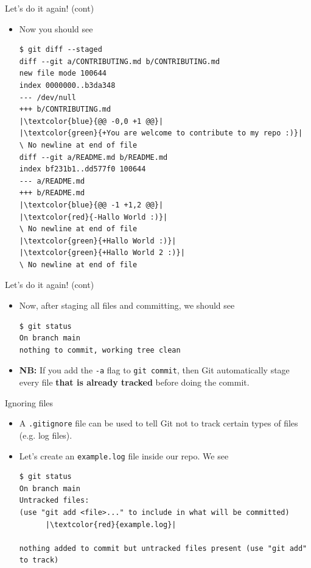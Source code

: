 \documentclass[
hyperref={bookmarks=false},
xcolor={dvipsnames,svgnames*,x11names*}, 
12pt
]{beamer}
\begin{document}
\begin{frame}[fragile]{Let's do it again! (cont)}
\vspace{-0.5cm}
\begin{itemize}
\itemsep 2ex
\item Now you should see
\begin{lstlisting}
$ git diff --staged
diff --git a/CONTRIBUTING.md b/CONTRIBUTING.md
new file mode 100644
index 0000000..b3da348
--- /dev/null
+++ b/CONTRIBUTING.md
|\textcolor{blue}{@@ -0,0 +1 @@}|
|\textcolor{green}{+You are welcome to contribute to my repo :)}|
\ No newline at end of file
diff --git a/README.md b/README.md
index bf231b1..dd577f0 100644
--- a/README.md
+++ b/README.md
|\textcolor{blue}{@@ -1 +1,2 @@}|
|\textcolor{red}{-Hallo World :)}|
\ No newline at end of file
|\textcolor{green}{+Hallo World :)}|
|\textcolor{green}{+Hallo World 2 :)}|
\ No newline at end of file
\end{lstlisting}
\end{itemize}
\end{frame}

\begin{frame}[fragile]{Let's do it again! (cont)}
\vspace{-0.5cm}
\begin{itemize}
\itemsep 2ex
\item Now, after staging all files and committing, we should see 
\begin{lstlisting}
$ git status
On branch main
nothing to commit, working tree clean
\end{lstlisting}
\item \textbf{NB:} If you add the \texttt{-a} flag to \texttt{git commit}, then Git automatically stage every file \textbf{that is already tracked} before doing the commit. 
\end{itemize}
\end{frame}

\begin{frame}[fragile]{Ignoring files}
\vspace{-0.5cm}
\begin{itemize}
\itemsep 2ex
\item A \texttt{.gitignore} file can be used to tell Git not to track certain types of files (e.g. log files). 
\item Let's create an \texttt{example.log} file inside our repo. We see 
\begin{lstlisting}
$ git status
On branch main
Untracked files:
(use "git add <file>..." to include in what will be committed)
      |\textcolor{red}{example.log}|

nothing added to commit but untracked files present (use "git add" to track)
\end{lstlisting}
\end{itemize}
\end{frame}
\end{document}
